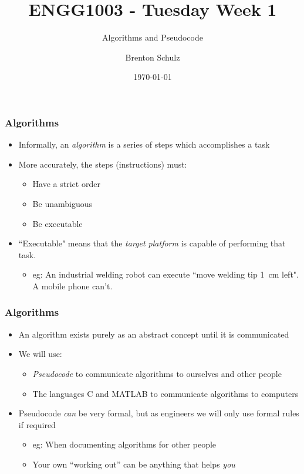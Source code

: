 \documentclass[14pt]{beamer}
\title{ENGG1003 - Tuesday Week 1}
\subtitle{Algorithms and Pseudocode}
\author{Brenton Schulz}
\institute{University of Newcastle}
\date{\today}
\begin{document}
\titlepage

\begin{frame} %
\frametitle{Algorithms}
\begin{itemize}
\item Informally, an \textit{algorithm} is a series of steps which accomplishes a task
\item More accurately, the steps (instructions) must:
	\begin{itemize}
		\item Have a strict order
		\item Be unambiguous
		\item Be executable
	\end{itemize}
\item ``Executable" means that the \textit{target platform} is capable of performing that task.
	\begin{itemize}
		\item eg: An industrial welding robot can execute ``move welding tip 1~cm left". A mobile phone can't.
	\end{itemize}
\end{itemize}
\end{frame}

\begin{frame} %
\frametitle{Algorithms}
\begin{itemize}
\item An algorithm exists purely as an abstract concept until it is communicated
\item We will use:
	\begin{itemize}
	\item \textit{Pseudocode} to communicate algorithms to ourselves and other people
	\item The languages C and MATLAB to communicate algorithms to computers
	\end{itemize}
\item Pseudocode \textit{can} be very formal, but as engineers we will only use formal rules if required
	\begin{itemize}
		\item eg: When documenting algorithms for other people
		\item Your own ``working out'' can be anything that helps \textit{you}
	\end{itemize}
\end{itemize}
\end{frame}
\end{document}
